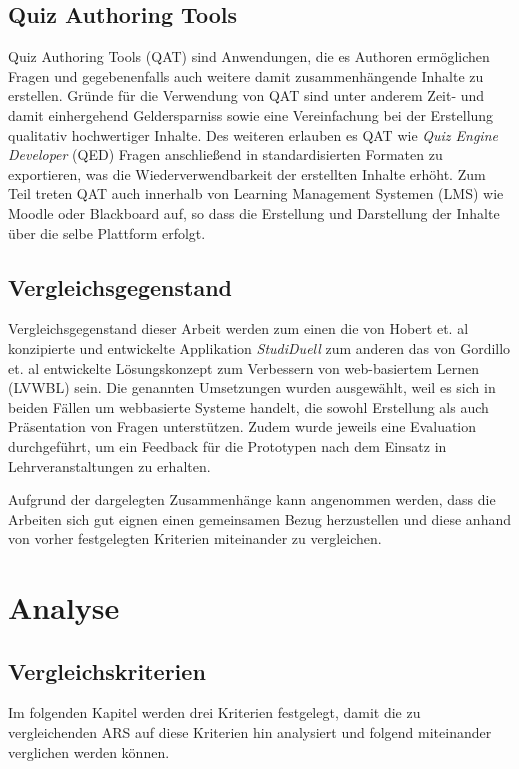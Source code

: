 \documentclass[conference]{IEEEtran}
\begin{document}
\subsection{Quiz Authoring Tools}
Quiz Authoring Tools (QAT) sind Anwendungen, die es Authoren ermöglichen Fragen und gegebenenfalls auch weitere damit zusammenhängende Inhalte zu erstellen. Gründe für die Verwendung von QAT sind unter anderem Zeit- und damit einhergehend Geldersparniss sowie eine Vereinfachung bei der Erstellung qualitativ hochwertiger Inhalte. Des weiteren erlauben es QAT wie \emph{Quiz Engine Developer} (QED) Fragen anschließend in standardisierten Formaten zu exportieren, was die Wiederverwendbarkeit der erstellten Inhalte erhöht. Zum Teil treten QAT auch innerhalb von Learning Management Systemen (LMS) wie Moodle oder Blackboard auf, so dass die Erstellung und Darstellung der Inhalte über die selbe Plattform erfolgt. \cite[p. 2]{Gordillo2015} 

\subsection{Vergleichsgegenstand}
Vergleichsgegenstand dieser Arbeit werden zum einen die von Hobert et. al konzipierte und entwickelte Applikation \emph{StudiDuell}\cite{Hobert2017} zum anderen das von Gordillo et. al entwickelte Lösungskonzept zum Verbessern von web-basiertem Lernen (LVWBL) \cite{Gordillo2015} sein. Die genannten Umsetzungen wurden ausgewählt, weil es sich in beiden Fällen um webbasierte Systeme handelt, die sowohl Erstellung als auch Präsentation von Fragen unterstützen. Zudem wurde jeweils eine Evaluation durchgeführt, um ein Feedback für die Prototypen nach dem Einsatz in Lehrveranstaltungen zu erhalten.
\cite{Hobert2017} \cite{Gordillo2015}

Aufgrund der dargelegten Zusammenhänge kann angenommen werden, dass die Arbeiten sich gut eignen einen gemeinsamen Bezug herzustellen und diese anhand von vorher festgelegten Kriterien miteinander zu vergleichen.

\section{Analyse}

\subsection{Vergleichskriterien}
Im folgenden Kapitel werden drei Kriterien festgelegt, damit die zu vergleichenden ARS auf diese Kriterien hin analysiert und folgend miteinander verglichen werden können.
\\
\end{document}
